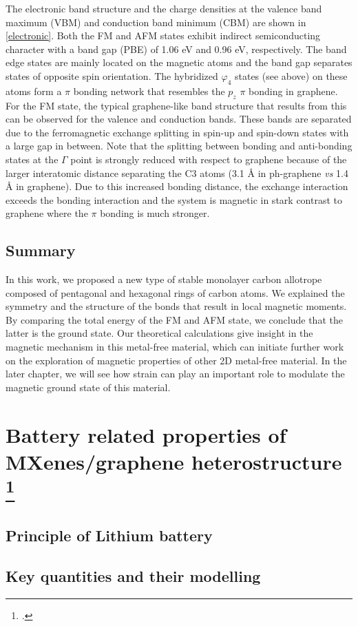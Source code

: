 The electronic band structure and the charge densities at the valence band maximum (VBM) and conduction band minimum (CBM) are shown in \autoref{electronic}. Both the FM and AFM states exhibit indirect semiconducting character with a band gap (PBE) of 1.06 eV and 0.96 eV, respectively. The band edge states are mainly located on the magnetic atoms and the band gap separates states of opposite spin orientation. The hybridized $\varphi_4$ states (see above) on these atoms form a $\pi$ bonding network that resembles the $p_z$ $\pi$ bonding in graphene. For the FM state, the typical graphene-like band structure that results from this can be observed for the valence and conduction bands. These bands are separated due to the ferromagnetic exchange splitting in spin-up and spin-down states with a large gap in between. Note that the splitting between bonding and anti-bonding states at the $\Gamma$ point is strongly reduced with respect to graphene because of the larger interatomic distance separating the C3 atoms (3.1 {\AA} in ph-graphene \textit{vs} 1.4 {\AA} in graphene). Due to this increased bonding distance, the exchange interaction exceeds the bonding interaction and the system is magnetic in stark contrast to graphene where the $\pi$ bonding is much stronger.

\subsection{Summary}
In this work, we proposed a new type of stable monolayer carbon allotrope composed of pentagonal and hexagonal rings of carbon atoms. We explained the symmetry and the structure of the bonds that result in local magnetic moments. By comparing the total energy of the FM and AFM state, we conclude that the latter is the ground state. Our theoretical calculations give insight in the magnetic mechanism in this metal-free material, which can initiate further work on the exploration of magnetic properties of other 2D metal-free material. In the later chapter, we will see how strain can play an important role to modulate the magnetic ground state of this material.


\section[Battery related properties of MXenes/graphene heterostructure]{Battery related properties of MXenes/graphene heterostructure \footcite[This work will be published as:][]{Aierken2017.battery}}
\subsection{Principle of Lithium battery}
\subsection{Key quantities and their modelling}